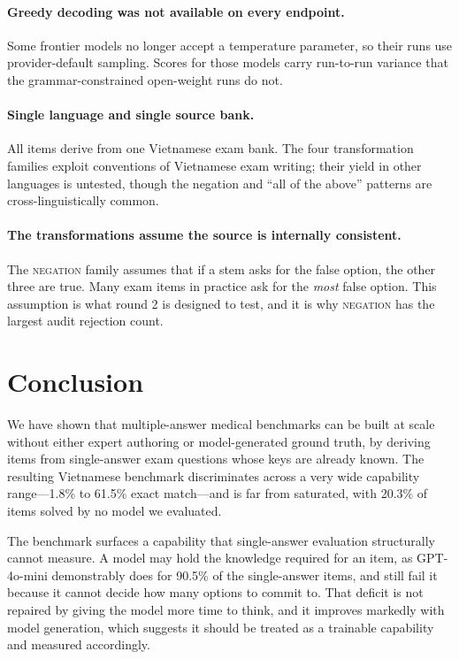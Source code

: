 \documentclass{article} %
\begin{document}
\paragraph{Greedy decoding was not available on every endpoint.} Some frontier models no
longer accept a temperature parameter, so their runs use provider-default sampling. Scores
for those models carry run-to-run variance that the grammar-constrained open-weight runs do
not.

\paragraph{Single language and single source bank.} All items derive from one Vietnamese
exam bank. The four transformation families exploit conventions of Vietnamese exam writing;
their yield in other languages is untested, though the negation and ``all of the above''
patterns are cross-linguistically common.

\paragraph{The transformations assume the source is internally consistent.} The
\textsc{negation} family assumes that if a stem asks for the false option, the other three
are true. Many exam items in practice ask for the \emph{most} false option. This assumption
is what round 2 is designed to test, and it is why \textsc{negation} has the largest audit
rejection count.

\section{Conclusion}

We have shown that multiple-answer medical benchmarks can be built at scale without either
expert authoring or model-generated ground truth, by deriving items from single-answer exam
questions whose keys are already known. The resulting Vietnamese benchmark discriminates
across a very wide capability range---1.8\% to 61.5\% exact match---and is far from
saturated, with 20.3\% of items solved by no model we evaluated.

The benchmark surfaces a capability that single-answer evaluation structurally cannot
measure. A model may hold the knowledge required for an item, as GPT-4o-mini demonstrably
does for 90.5\% of the single-answer items, and still fail it because it cannot decide how
many options to commit to. That deficit is not repaired by giving the model more time to
think, and it improves markedly with model generation, which suggests it should be treated
as a trainable capability and measured accordingly.
\end{document}
